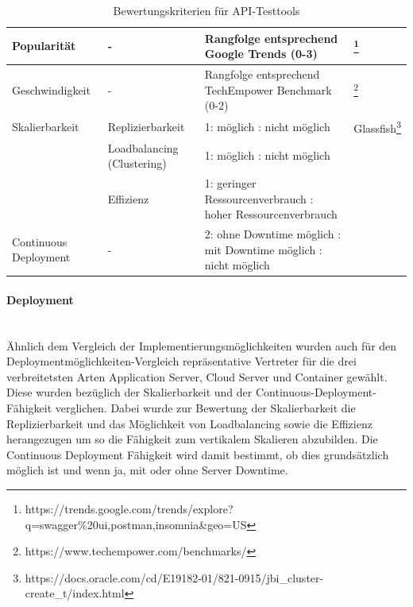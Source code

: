 \documentclass[notitlepage, hidelinks]{article}
\begin{document}
\begin{table}[H]
\begin{minipage}{\textwidth}
\begin{tabular}{|L{2.5cm}|L{3cm}|L{5.5cm}|L{3cm}|}
Popularität & - & Rangfolge entsprechend Google Trends (0-3) & \footnote{https://trends.google.com/trends/explore?q=swagger\%20ui,postman,insomnia\&geo=US} \\ \hline
Geschwindigkeit & - & Rangfolge entsprechend TechEmpower Benchmark (0-2) & \footnote{https://www.techempower.com/benchmarks/} \\ \hline
Skalierbarkeit & Replizierbarkeit & 1: möglich : nicht möglich & Glassfish\footnote{https://docs.oracle.com/cd/E19182-01/821-0915/jbi\_cluster-create\_t/index.html} \\    
& Loadbalancing (Clustering) & 1: möglich : nicht möglich &  \\ 
& Effizienz & 1: geringer Ressourcenverbrauch : hoher Ressourcenverbrauch &  \\ \hline
Continuous Deployment & - & 2: ohne Downtime möglich : mit Downtime möglich : nicht möglich & \\ \hline
\end{tabular}
\end{minipage}
\label{tab:bewertungskriterien}
\caption{Bewertungskriterien für API-Testtools}
\end{table}%
\newpage

\paragraph{Deployment} \mbox{} \\
Ähnlich dem Vergleich der Implementierungsmöglichkeiten wurden auch für den Deploymentmöglichkeiten-Vergleich repräsentative Vertreter für die drei verbreitetsten Arten Application Server, Cloud Server und Container gewählt. Diese wurden bezüglich der Skalierbarkeit und der Continuous-Deployment-Fähigkeit verglichen. Dabei wurde zur Bewertung der Skalierbarkeit die Replizierbarkeit und das Möglichkeit von Loadbalancing sowie die Effizienz herangezugen um so die Fähigkeit zum vertikalem Skalieren abzubilden. Die Continuous Deployment Fähigkeit wird damit bestimmt, ob dies grundsätzlich möglich ist und wenn ja, mit oder ohne Server Downtime. \\
\end{document}

